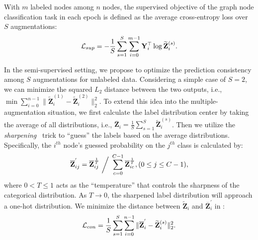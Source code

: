  


With $m$ labeled nodes among $n$ nodes, the supervised objective of the graph node classification task in each epoch is defined as the average cross-entropy loss over $S$ augmentations:
\begin{equation}
\small
\label{equ:loss}
	\mathcal{L}_{sup} = -\frac{1}{S}\sum_{s=1}^{S}\sum_{i=0}^{m-1}\mathbf{Y}_{i}^\top \log \widetilde{\mathbf{Z}}_{i}^{(s)} .
\end{equation}






In the semi-supervised setting, we propose to optimize the prediction consistency among $S$ augmentations for unlabeled data. 
Considering a simple case of $S=2$, we can minimize the squared $L_2$ distance between the two outputs, i.e.,
 $
\min \sum_{i=0}^{n-1} \|\widetilde{\mathbf{Z}}^{(1)}_i - \widetilde{\mathbf{Z}}^{(2)}_i\|_2^2$.
To extend this idea into the multiple-augmentation situation, 
we first 
calculate the label distribution center by taking the average of all distributions, i.e., 
 $ \overline{\mathbf{Z}}_i = \frac{1}{S}\sum_{s=1}^{S} \widetilde{\mathbf{Z}}_i^{(s)}$. Then we utilize the \textit{sharpening}~\cite{berthelot2019mixmatch} trick to ``guess'' the labels based on the average distributions. Specifically, the $i^{th}$ node's guessed probability on the $j^{th}$ class is calculated by:
\begin{equation}
\small
\label{equ:sharpen}
\overline{\mathbf{Z}}^{'}_{ij} = \overline{\mathbf{Z}}_{ij}^{\frac{1}{T}} ~\bigg/~\sum_{c=0}^{C-1}\overline{\mathbf{Z}}_{ic}^{\frac{1}{T}}, (0\leq j \leq C-1),
\end{equation}
where $0< T\leq 1$ acts as the ``temperature'' that controls the sharpness of the categorical distribution. 
As $T \to 0$, the sharpened label distribution will approach a one-hot distribution. 
We minimize the distance between  $\widetilde{\mathbf{Z}}_i$ and $\overline{\mathbf{Z}}^{'}_i$ in \model:
\begin{equation}
\small
\label{equ:consistency}
    \mathcal{L}_{con} =   \frac{1}{S}\sum_{s=1}^{S}\sum_{i=0}^{n-1} \|\overline{\mathbf{Z}}^{'}_i- \widetilde{\mathbf{Z}}^{(s)}_i\|_2^2.
\end{equation}


